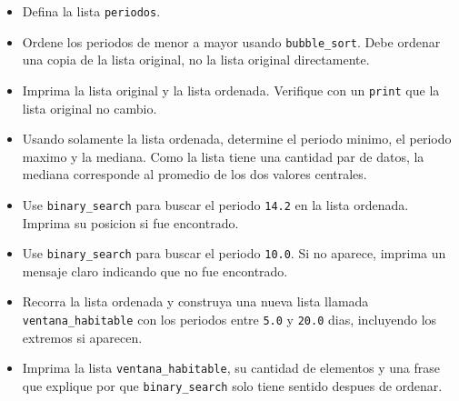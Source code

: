 \begin{tcolorbox}[colback=blue!2!white,colframe=blue!55!black,title={Enunciado},
                  before skip=3pt,after skip=5pt,boxsep=3pt,top=3pt,bottom=3pt,
                  breakable]
\begin{itemize}
\setlength{\topsep}{4pt}
\setlength{\itemsep}{3pt}
\setlength{\parsep}{0pt}
\item[(a)] Defina la lista \texttt{periodos}.
\item[(b)] Ordene los periodos de menor a mayor usando \texttt{bubble\_sort}.
Debe ordenar una copia de la lista original, no la lista original directamente.
\item[(c)] Imprima la lista original y la lista ordenada. Verifique con un
\texttt{print} que la lista original no cambio.
\item[(d)] Usando solamente la lista ordenada, determine el periodo minimo, el
periodo maximo y la mediana. Como la lista tiene una cantidad par de datos, la
mediana corresponde al promedio de los dos valores centrales.
\item[(e)] Use \texttt{binary\_search} para buscar el periodo \texttt{14.2} en
la lista ordenada. Imprima su posicion si fue encontrado.
\item[(f)] Use \texttt{binary\_search} para buscar el periodo \texttt{10.0}.
Si no aparece, imprima un mensaje claro indicando que no fue encontrado.
\item[(g)] Recorra la lista ordenada y construya una nueva lista llamada
\texttt{ventana\_habitable} con los periodos entre \texttt{5.0} y \texttt{20.0}
dias, incluyendo los extremos si aparecen.
\item[(h)] Imprima la lista \texttt{ventana\_habitable}, su cantidad de
elementos y una frase que explique por que \texttt{binary\_search} solo tiene
sentido despues de ordenar.
\end{itemize}
\end{tcolorbox}

